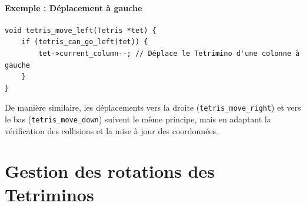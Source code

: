 \documentclass[12pt,a4paper]{report}
\begin{document}
\paragraph{Exemple : Déplacement à gauche}
\begin{lstlisting}
void tetris_move_left(Tetris *tet) {
    if (tetris_can_go_left(tet)) {
        tet->current_column--; // Déplace le Tetrimino d'une colonne à gauche
    }
}
\end{lstlisting}

De manière similaire, les déplacements vers la droite (\texttt{tetris\_move\_right}) et vers le bas (\texttt{tetris\_move\_down}) suivent le même principe, mais en adaptant la vérification des collisions et la mise à jour des coordonnées.
\newpage

\section{Gestion des rotations des Tetriminos}
\end{document}
